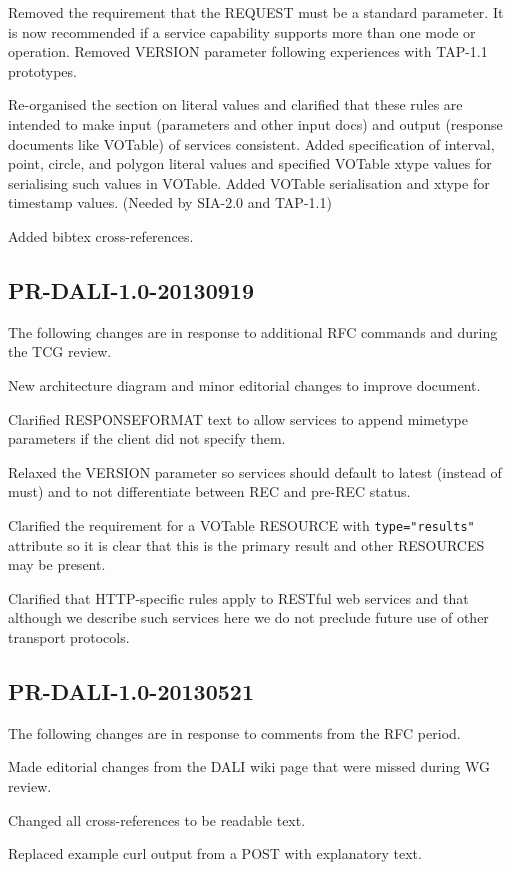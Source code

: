 \documentclass[11pt,letter]{ivoa}
\begin{document}
Removed the requirement that the REQUEST must be a standard parameter. It is
now recommended if a service capability supports more than one mode or
operation. Removed VERSION parameter following experiences with TAP-1.1
prototypes.

Re-organised the section on literal values and clarified that these rules
are intended to make input (parameters and other input docs) and output
(response documents like VOTable) of services consistent. Added specification
of interval, point, circle, and polygon literal values and specified VOTable
xtype values for serialising such values in VOTable. Added VOTable serialisation
and xtype for timestamp values. (Needed by SIA-2.0 and TAP-1.1)

Added bibtex cross-references.

\subsection{PR-DALI-1.0-20130919}
The following changes are in response to additional RFC commands and during the
TCG review.

New architecture diagram and minor editorial changes to improve document.

Clarified RESPONSEFORMAT text to allow services to append mimetype parameters if
the client did not specify them.

Relaxed the VERSION parameter so services should default to latest (instead of
must) and to not differentiate between REC and pre-REC status.

Clarified the requirement for a VOTable RESOURCE with \verb|type="results"| attribute
so it is clear that this is the primary result and other RESOURCES may be
present.

Clarified that HTTP-specific rules apply to RESTful web services and that
although we describe such services here we do not preclude future use of other
transport protocols.

\subsection{PR-DALI-1.0-20130521}
The following changes are in response to comments from the RFC period.

Made editorial changes from the DALI wiki page that were missed during WG
review.

Changed all cross-references to be readable text.

Replaced example curl output from a POST with explanatory text.
\end{document}
